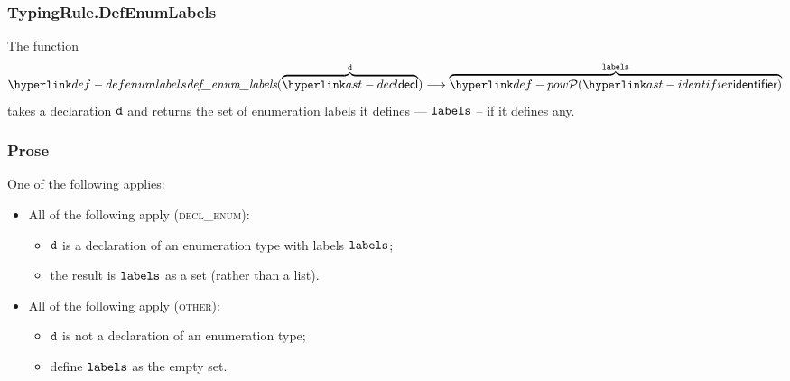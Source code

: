 
\subsubsection{TypingRule.DefEnumLabels \label{sec:TypingRule.DefEnumLabels}}
\hypertarget{def-defenumlabels}{}
The function
\[
\defenumlabels(\overname{\decl}{\vd}) \aslto \overname{\pow{\identifier}}{\vlabels}
\]
takes a declaration $\texttt{d}$ and returns the set of enumeration labels it defines --- $\texttt{labels}$ --
if it defines any.

\subsubsection{Prose}
One of the following applies:
\begin{itemize}
  \item All of the following apply (\textsc{decl\_enum}):
  \begin{itemize}
    \item $\texttt{d}$ is a declaration of an enumeration type with labels $\texttt{labels}$;
    \item the result is $\texttt{labels}$ as a set (rather than a list).
  \end{itemize}

  \item All of the following apply (\textsc{other}):
  \begin{itemize}
    \item $\texttt{d}$ is not a declaration of an enumeration type;
    \item define $\texttt{labels}$ as the empty set.
  \end{itemize}
\end{itemize}


